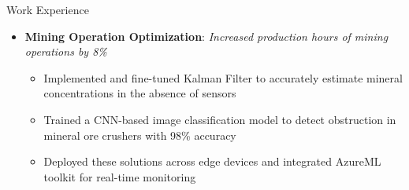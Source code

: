 \documentclass{resume} %
\begin{document}
\begin{rSection}{Work Experience}
\begin{itemize}[leftmargin=1em,rightmargin=0.2in ,itemsep=-5pt, topsep=-5pt, before={\vspace{0.0ex}},after=\vspace{-1ex}]
 \item \textbf{Mining Operation Optimization}:
\begingroup
			\spaceskip=2.4pt
\emph{Increased production hours of mining operations by 8\%}
			\endgroup
		\begin{itemize}[leftmargin=0em,itemsep=-6pt, topsep=-5pt, before={\vspace{-0.3ex}},after=\vspace{0.5ex}]
		\item  \begingroup
			\spaceskip=2.2pt
				Implemented and fine-tuned Kalman Filter to accurately estimate mineral concentrations in the absence of sensors
			\endgroup
		\item \begingroup
			\spaceskip=2.5pt
				Trained a CNN-based image classification model to detect obstruction in mineral ore crushers with 98\% accuracy
				\endgroup
		\item Deployed these solutions across edge devices and integrated AzureML toolkit for real-time monitoring
		\end{itemize}



\end{itemize}
\end{rSection}
\end{document}
